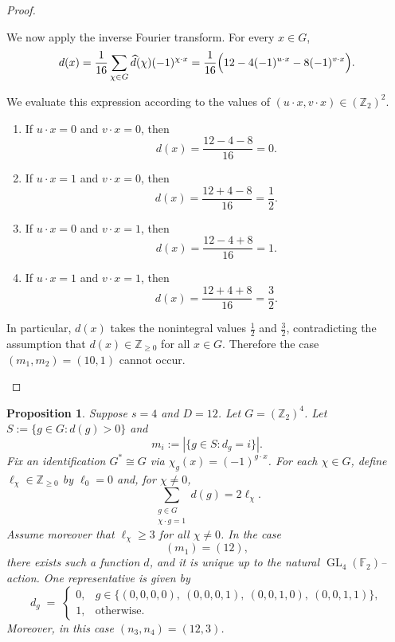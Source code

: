 \documentclass[12pt,twoside,]{amsart}
\theoremstyle{plain}
\newtheorem{proposition}[theorem]{Proposition}
\theoremstyle{definition}
\begin{document}
\begin{proof}
\begin{enumerate}
We now apply the inverse Fourier transform. For every $x\in G$,
\[
d(x)
=
\frac{1}{16}\sum_{\chi\in G}\widehat d(\chi)(-1)^{\chi\cdot x}
=
\frac{1}{16}\Bigl(12-4(-1)^{u\cdot x}-8(-1)^{v\cdot x}\Bigr).
\]

We evaluate this expression according to the values of
$(u\cdot x,v\cdot x)\in(\mathbb Z_2)^2$.

\begin{enumerate}
\item If $u\cdot x=0$ and $v\cdot x=0$, then
\[
d(x)=\frac{12-4-8}{16}=0.
\]

\item If $u\cdot x=1$ and $v\cdot x=0$, then
\[
d(x)=\frac{12+4-8}{16}=\frac12.
\]

\item If $u\cdot x=0$ and $v\cdot x=1$, then
\[
d(x)=\frac{12-4+8}{16}=1.
\]

\item If $u\cdot x=1$ and $v\cdot x=1$, then
\[
d(x)=\frac{12+4+8}{16}=\frac32.
\]
\end{enumerate}

In particular, $d(x)$ takes the nonintegral values $\frac12$ and $\frac32$,
contradicting the assumption that $d(x)\in\mathbb Z_{\ge 0}$ for all $x\in G$.
Therefore the case $(m_1,m_2)=(10,1)$ cannot occur.



\end{enumerate}


\end{proof}

\begin{proposition}\label{s=4; m = 1; k = 2; D = 12 possibility}
Suppose $s=4$ and $D=12$. Let $G=(\mathbb Z_2)^4$. 
Let $S:=\{g\in G : d(g)>0\}$ and 
\[
m_i:=|\{g\in S : d_g=i\}|.
\]
Fix an identification $G^*\cong G$ via $\chi_g(x)=(-1)^{g\cdot x}$.
For each $\chi\in G$, define $\ell_\chi\in\mathbb Z_{\ge 0}$ by $\ell_0=0$ and,
for $\chi\neq 0$,
\[
\sum_{\substack{g\in G\\ \chi\cdot g=1}} d(g)=2\ell_\chi.
\]
Assume moreover that $\ell_\chi\ge 3$ for all $\chi\neq 0$.
In the case
\[
(m_1)=(12),
\]
there exists such a function $d$, and it is unique up to the natural
$\operatorname{GL}_4(\mathbb F_2)$--action. One representative is given by
\[
d_g \;=\;
\begin{cases}
0, & g\in\{(0,0,0,0),\ (0,0,0,1),\ (0,0,1,0),\ (0,0,1,1)\},\\[4pt]
1, & \text{otherwise.}
\end{cases}
\]
Moreover, in this case $(n_3,n_4) = (12,3)$.
\end{proposition}
\end{document}
